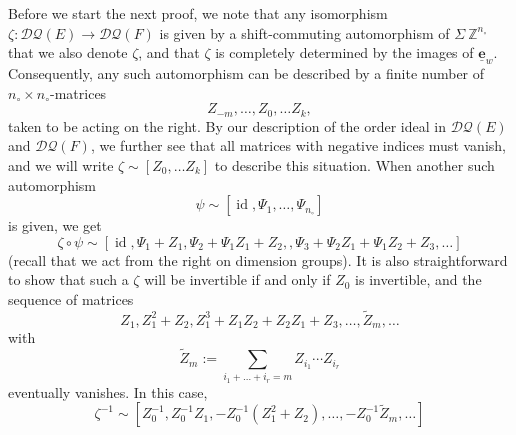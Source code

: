 \documentclass[12pt]{amsbook}%
\theoremstyle{defin}
\theoremstyle{remark}
\numberwithin{equation}{chapter}
\numberwithin{theor}{section}
\newcommand{\ZZ}{\mathbb{Z}}
\newcommand{\DQ}{\mathcal{DQ}}
\newcommand{\id}{\operatorname{id}}
\newcommand{\nsX}{\Sigma\ }
\newcommand{\singX}{{\circ}}
\newcommand{\eee}{\underline{\mathbf e}}
\newcommand{\nos}{{n_\singX}}
\begin{document}
Before we start the next proof, we note that any isomorphism $\zeta:\DQ(E)\to \DQ(F)$ is given by a shift-commuting automorphism of $\nsX \ZZ^{\nos}$ that we also denote $\zeta$, and that $\zeta$ is completely determined by the images of $\eee_w$. Consequently, any such automorphism can be described by a finite number of $\nos\times \nos$-matrices
\[
Z_{-m},\dots,Z_0,\dots Z_k,
\]
taken to be acting on the right. By our description of the order ideal in $\DQ(E)$ and $\DQ(F)$, we further see that all matrices with negative indices must vanish, and we will write $\zeta\sim [Z_0,\dots Z_k]$ to describe this situation. When another such automorphism 
\[
\psi\sim [\id,\Psi_1,\dots, \Psi_{\nos}]
\]
is given, we get
\begin{equation}\label{mulZPsi}
\zeta\circ\psi\sim[\id,\Psi_1+Z_1,\Psi_2+\Psi_1Z_1+Z_2,,\Psi_3+\Psi_2Z_1+\Psi_1Z_2+Z_3,\dots]
\end{equation}
(recall that we act from the right on dimension groups).
It is also straightforward to show that such a $\zeta$ will be invertible if and only if $Z_0$  is invertible, and the sequence of matrices
\[
Z_1,Z_1^2+Z_2,Z_1^3+Z_1Z_2+Z_2Z_1+Z_3,\dots,\widetilde{Z}_m,\dots
\]
 with
\[
\widetilde{Z}_m:=\sum_{i_1+\dots+ i_r=m}Z_{i_1}\cdots Z_{i_r}
\]
eventually vanishes. In this case,
\begin{equation}\label{invertZ}
\zeta^{-1}\sim[Z_0^{-1},Z_0^{-1}Z_1,-Z_0^{-1}(Z_1^2+Z_2),\dots,-Z_0^{-1}\widetilde{Z}_m,\dots]
\end{equation}
\end{document}

